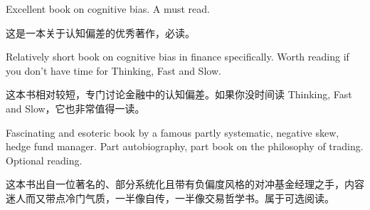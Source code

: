 



\begin{englishblock} Excellent book on cognitive bias. A must read. \end{englishblock}

\begin{chineseblock}这是一本关于认知偏差的优秀著作，必读。\end{chineseblock}


\begin{englishblock} Relatively short book on cognitive bias in finance specifically. Worth reading if you don't have time for Thinking, Fast and Slow. \end{englishblock}

\begin{chineseblock}这本书相对较短，专门讨论金融中的认知偏差。如果你没时间读 Thinking, Fast and Slow，它也非常值得一读。\end{chineseblock}


\begin{englishblock} Fascinating and esoteric book by a famous partly systematic, negative skew, hedge fund manager. Part autobiography, part book on the philosophy of trading. Optional reading. \end{englishblock}

\begin{chineseblock}这本书出自一位著名的、部分系统化且带有负偏度风格的对冲基金经理之手，内容迷人而又带点冷门气质，一半像自传，一半像交易哲学书。属于可选阅读。\end{chineseblock}



